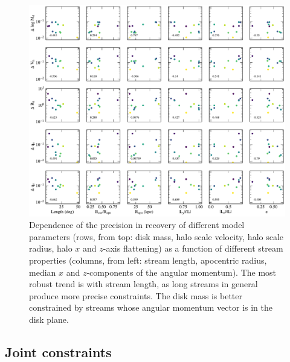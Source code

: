 \documentclass[modern]{aastex61}
\begin{document}
\begin{figure}
\begin{center}
\includegraphics[width=\textwidth]{orbit_correlations.pdf}
\caption{Dependence of the precision in recovery of different model parameters (rows, from top: disk mass, halo scale velocity, halo scale radius, halo $x$ and $z$-axis flattening) as a function of different stream properties (columns, from left: stream length, apocentric radius, median $x$ and $z$-components of the angular momentum).
The most robust trend is with stream length, as long streams in general produce more precise constraints.
The disk mass is better constrained by streams whose angular momentum vector is in the disk plane.}
\label{fig:orbit_correlations}
\end{center}
\end{figure}



\subsection{Joint constraints}
\label{sec:res_joint}
\end{document}
